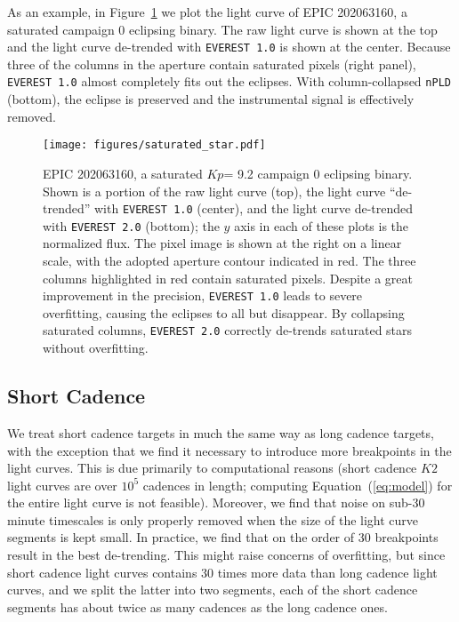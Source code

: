 \documentclass[]{emulateapj}
\newcommand{\Kp}{\ensuremath{Kp}}
\begin{document}
As an example, in Figure~\ref{fig:saturated_star} we plot the light curve of EPIC 202063160, a saturated
campaign 0 eclipsing binary. The raw light curve is shown at the top and the light curve
de-trended with \texttt{EVEREST 1.0} is shown at the center. Because three of the columns
in the aperture contain saturated pixels (right panel), \texttt{EVEREST 1.0} almost 
completely fits out the eclipses. With column-collapsed \texttt{nPLD} (bottom), the
eclipse is preserved and the instrumental signal is effectively removed.

\begin{figure}[hbt]
  \begin{center}
      \texttt{[image: figures/saturated\_star.pdf]}
       \caption{EPIC 202063160, a saturated \Kp = 9.2 campaign 0 eclipsing
       binary. Shown is a portion of the raw light curve (top), the light curve ``de-trended''
       with \texttt{EVEREST 1.0} (center), and the light curve de-trended with \texttt{EVEREST 2.0}
       (bottom); the $y$ axis in each of these plots is the normalized flux.
       The pixel image is shown at the right on a linear scale, with the adopted aperture
       contour indicated in red. The three columns highlighted in red contain saturated
       pixels. Despite a great improvement in the precision, \texttt{EVEREST 1.0} leads to severe
       overfitting, causing the eclipses to all but disappear. By collapsing saturated columns,
       \texttt{EVEREST 2.0} correctly de-trends saturated stars without overfitting.}
     \label{fig:saturated_star}
  \end{center}
\end{figure}

\subsection{Short Cadence}
\label{sec:impl_shortcad}
We treat short cadence targets in much the same way as long cadence targets, with the exception
that we find it necessary to introduce more breakpoints in the light curves. This is
due primarily to computational reasons (short cadence $K2$ light curves are over $10^5$ cadences
in length; computing Equation~(\ref{eq:model}) for the entire light curve is not feasible).
Moreover, we find that noise on sub-30 minute timescales is only properly removed when
the size of the light curve segments is kept small. In practice, we find that on the order of
30 breakpoints result in the best de-trending. This might raise concerns of overfitting, but
since short cadence light curves contains 30 times more data than long cadence light curves,
and we split the latter into two segments, each of the short cadence segments has about twice
as many cadences as the long cadence ones.
\end{document}
